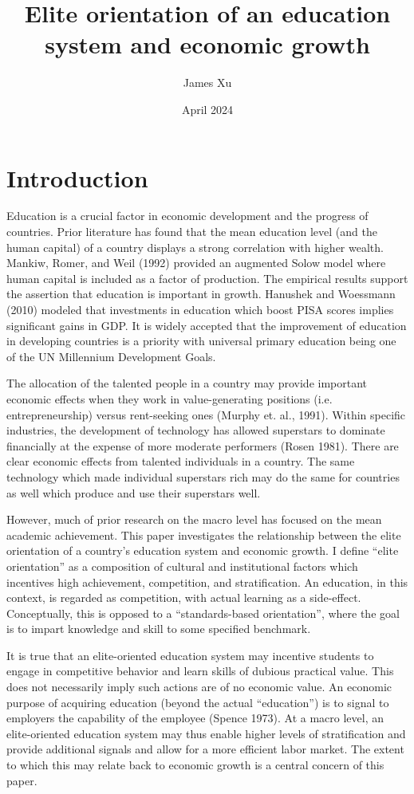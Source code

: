 \documentclass[11pt]{article}
\title{Elite orientation of an education system and economic growth}
\author{James Xu}
\date{April 2024}
\begin{document}
\maketitle

\section{Introduction}
Education is a crucial factor in economic development and the progress of countries. Prior literature has found that the mean education level (and the human capital) of a country displays a strong correlation with higher wealth. Mankiw, Romer, and Weil (1992) provided an augmented Solow model where human capital is included as a factor of production. The empirical results support the assertion that education is important in growth. Hanushek and Woessmann (2010) modeled that investments in education which boost PISA scores implies significant gains in GDP. It is widely accepted that the improvement of education in developing countries is a priority with universal primary education being one of the UN Millennium Development Goals.

The allocation of the talented people in a country may provide important economic effects when they work in value-generating positions (i.e. entrepreneurship) versus rent-seeking ones (Murphy et. al., 1991). Within specific industries, the development of technology has allowed superstars to dominate financially at the expense of more moderate performers (Rosen 1981). There are clear economic effects from talented individuals in a country. The same technology which made individual superstars rich may do the same for countries as well which produce and use their superstars well.

However, much of prior research on the macro level has focused on the mean academic achievement. This paper investigates the relationship between the elite orientation of a country’s education system and economic growth. I define “elite orientation” as a composition of cultural and institutional factors which incentives high achievement, competition, and stratification. An education, in this context, is regarded as competition, with actual learning as a side-effect. Conceptually, this is opposed to a “standards-based orientation”, where the goal is to impart knowledge and skill to some specified benchmark.

It is true that an elite-oriented education system may incentive students to engage in competitive behavior and learn skills of dubious practical value. This does not necessarily imply such actions are of no economic value. An economic purpose of acquiring education (beyond the actual “education”) is to signal to employers the capability of the employee (Spence 1973). At a macro level, an elite-oriented education system may thus enable higher levels of stratification and provide additional signals and allow for a more efficient labor market. The extent to which this may relate back to economic growth is a central concern of this paper.
\end{document}
